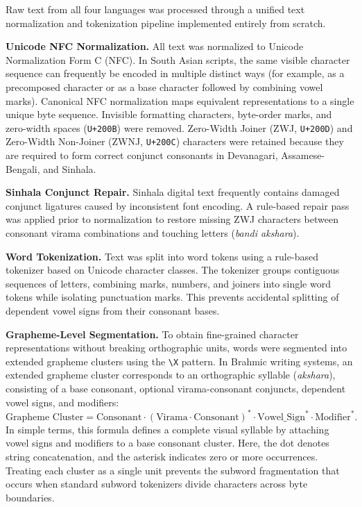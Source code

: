\documentclass[pdflatex,sn-mathphys-num]{sn-jnl}
\begin{document}
Raw text from all four languages was processed through a unified text normalization and tokenization pipeline implemented entirely from scratch.

\textbf{Unicode NFC Normalization.} All text was normalized to Unicode Normalization Form C (NFC). In South Asian scripts, the same visible character sequence can frequently be encoded in multiple distinct ways (for example, as a precomposed character or as a base character followed by combining vowel marks). Canonical NFC normalization maps equivalent representations to a single unique byte sequence. Invisible formatting characters, byte-order marks, and zero-width spaces (\texttt{U+200B}) were removed. Zero-Width Joiner (ZWJ, \texttt{U+200D}) and Zero-Width Non-Joiner (ZWNJ, \texttt{U+200C}) characters were retained because they are required to form correct conjunct consonants in Devanagari, Assamese-Bengali, and Sinhala.

\textbf{Sinhala Conjunct Repair.} Sinhala digital text frequently contains damaged conjunct ligatures caused by inconsistent font encoding. A rule-based repair pass was applied prior to normalization to restore missing ZWJ characters between consonant virama combinations and touching letters (\textit{bandi akshara}).

\textbf{Word Tokenization.} Text was split into word tokens using a rule-based tokenizer based on Unicode character classes. The tokenizer groups contiguous sequences of letters, combining marks, numbers, and joiners into single word tokens while isolating punctuation marks. This prevents accidental splitting of dependent vowel signs from their consonant bases.

\textbf{Grapheme-Level Segmentation.} To obtain fine-grained character representations without breaking orthographic units, words were segmented into extended grapheme clusters using the \texttt{\textbackslash X} pattern. In Brahmic writing systems, an extended grapheme cluster corresponds to an orthographic syllable (\textit{akshara}), consisting of a base consonant, optional virama-consonant conjuncts, dependent vowel signs, and modifiers:
\[
\text{Grapheme Cluster} = \text{Consonant} \cdot (\text{Virama} \cdot \text{Consonant})^* \cdot \text{Vowel\_Sign}^* \cdot \text{Modifier}^*.
\]
In simple terms, this formula defines a complete visual syllable by attaching vowel signs and modifiers to a base consonant cluster. Here, the dot denotes string concatenation, and the asterisk indicates zero or more occurrences. Treating each cluster as a single unit prevents the subword fragmentation that occurs when standard subword tokenizers divide characters across byte boundaries.
\end{document}
